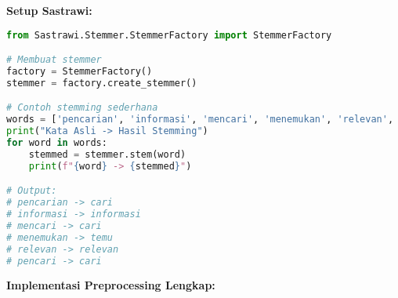 \textbf{Setup Sastrawi:}
\begin{lstlisting}[language=python, style=python]
from Sastrawi.Stemmer.StemmerFactory import StemmerFactory

# Membuat stemmer
factory = StemmerFactory()
stemmer = factory.create_stemmer()

# Contoh stemming sederhana
words = ['pencarian', 'informasi', 'mencari', 'menemukan', 'relevan', 'pencari']
print("Kata Asli -> Hasil Stemming")
for word in words:
    stemmed = stemmer.stem(word)
    print(f"{word} -> {stemmed}")

# Output:
# pencarian -> cari
# informasi -> informasi
# mencari -> cari
# menemukan -> temu
# relevan -> relevan
# pencari -> cari
\end{lstlisting}

\textbf{Implementasi Preprocessing Lengkap:}
